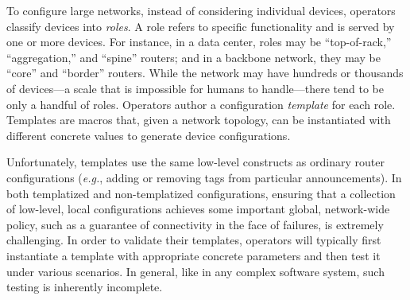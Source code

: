 \documentclass[numbers, 10pt]{sigplanconf}
\newcommand{\EG}{\emph{e.g.}}
\begin{document}
To configure large networks, instead of considering individual
devices, operators classify devices into {\em roles}. A role refers to
specific functionality and is served by one or more devices. For instance, in a
data center, roles may be ``top-of-rack,'' ``aggregation,'' and ``spine''
routers; and in a backbone network, they may be ``core'' and ``border''
routers. While the network may have hundreds or thousands of devices---a scale
that is impossible for humans to handle---there tend to be only a handful of roles.
%
Operators author a configuration {\em template} for each role. Templates are
macros that, given a network topology, can be instantiated with different concrete values to generate device configurations.

Unfortunately, templates use the same low-level constructs as ordinary router configurations (\EG,
adding or removing tags from particular announcements).  In both templatized
and non-templatized configurations, ensuring that a collection of low-level, local configurations
achieves some important global, network-wide policy, such as a guarantee of connectivity in the face of 
failures, is extremely challenging.
%
%
In order to validate  their templates, operators will typically first instantiate a template with appropriate
concrete parameters
and then test it under various scenarios.  In general, like in any complex software system, such testing is inherently incomplete.
\end{document}
